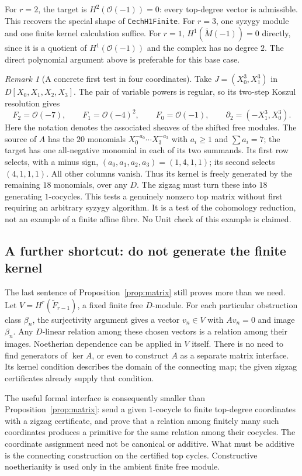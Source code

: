 \documentclass[11pt]{amsart}
\theoremstyle{definition}
\theoremstyle{remark}
\newtheorem{remark}[theorem]{Remark}
\newcommand{\OO}{\mathcal O}
\newcommand{\code}[1]{\texttt{#1}}
\begin{document}
For $r=2$, the target is $H^2(\OO(-1))=0$: every top-degree vector
is admissible. This recovers the special shape of
\code{CechH1Finite}. For $r=3$, one syzygy module and one finite
kernel calculation suffice. For $r=1$, $H^1(\widetilde M(-1))=0$
directly, since it is a quotient of $H^1(\OO(-1))$ and the complex
has no degree $2$. The direct polynomial argument above is preferable
for this base case.

\begin{remark}[A concrete first test in four coordinates]
Take $J=(X_0^3,X_1^3)$ in $D[X_0,X_1,X_2,X_3]$. The pair of
variable powers is regular, so its two-step Koszul resolution gives
\[
 F_2=\OO(-7),\qquad F_1=\OO(-4)^2,\qquad F_0=\OO(-1),
 \qquad\partial_2=(-X_1^3,X_0^3).
\]
Here the notation denotes the associated sheaves of the shifted
free modules. The source of $A$ has the $20$ monomials
$X_0^{-a_0}\cdots X_3^{-a_3}$ with $a_i\geq1$ and
$\sum a_i=7$; the target has one all-negative monomial in each
of its two summands. Its first row selects, with a minus sign,
$(a_0,a_1,a_2,a_3)=(1,4,1,1)$; its second selects $(4,1,1,1)$.
All other columns vanish. Thus its kernel is freely generated by
the remaining $18$ monomials, over any $D$. The zigzag must turn
these into $18$ generating $1$-cocycles. This tests a genuinely
nonzero top matrix without first requiring an arbitrary syzygy
algorithm. It is a test of the cohomology reduction, not an example
of a finite affine fibre. No Unit check of this example is claimed.
\end{remark}

\subsection{A further shortcut: do not generate the finite kernel}
The last sentence of Proposition~\ref{prop:matrix} still proves more
than we need. Let $V=H^r(\widetilde F_{r-1})$, a fixed finite free
$D$-module. For each particular obstruction class $\beta_n$, the
surjectivity argument gives a vector $v_n\in V$ with $Av_n=0$ and
image $\beta_n$. Any $D$-linear relation among these chosen vectors
is a relation among their images. Noetherian dependence can be
applied in $V$ itself. There is no need to find generators of
$\ker A$, or even to construct $A$ as a separate matrix interface.
Its kernel condition describes the domain of the connecting map;
the given zigzag certificates already supply that condition.

The useful formal interface is consequently smaller than
Proposition~\ref{prop:matrix}: send a given $1$-cocycle to finite
top-degree coordinates with a zigzag certificate, and prove that a
relation among finitely many such coordinates produces a primitive
for the same relation among their cocycles. The coordinate assignment
need not be canonical or additive. What must be additive is the
connecting construction on the certified top cycles. Constructive
noetherianity is used only in the ambient finite free module.
\end{document}
